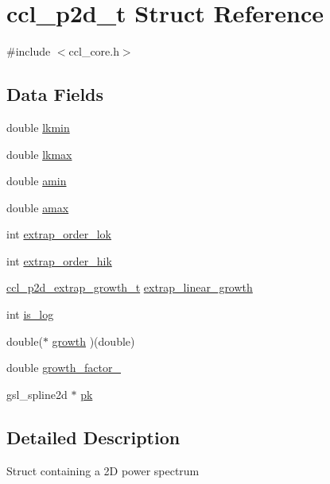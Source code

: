\hypertarget{structccl__p2d__t}{}\section{ccl\+\_\+p2d\+\_\+t Struct Reference}
\label{structccl__p2d__t}


{\ttfamily \#include $<$ccl\+\_\+core.\+h$>$}

\subsection*{Data Fields}
\begin{DoxyCompactItemize}
\item 
double \mbox{\hyperlink{structccl__p2d__t_a955661f32b72852c9bc7dfee5428c759}{lkmin}}
\item 
double \mbox{\hyperlink{structccl__p2d__t_aa95658067bf981859e38846ae8231f8f}{lkmax}}
\item 
double \mbox{\hyperlink{structccl__p2d__t_a9dd0557e6139d5560deb590157df53e3}{amin}}
\item 
double \mbox{\hyperlink{structccl__p2d__t_af090a647ddaaa73a69aadf73d6ae2bb5}{amax}}
\item 
int \mbox{\hyperlink{structccl__p2d__t_abc056210c9849cce402b91e4787df877}{extrap\+\_\+order\+\_\+lok}}
\item 
int \mbox{\hyperlink{structccl__p2d__t_a92786760b726c4e1ca48a9f403d79279}{extrap\+\_\+order\+\_\+hik}}
\item 
\mbox{\hyperlink{ccl__core_8h_a7c3bb0ab563e8da9e642173d5abdb208}{ccl\+\_\+p2d\+\_\+extrap\+\_\+growth\+\_\+t}} \mbox{\hyperlink{structccl__p2d__t_a6e804bda393db51d0b1e6536c8fcc387}{extrap\+\_\+linear\+\_\+growth}}
\item 
int \mbox{\hyperlink{structccl__p2d__t_a92b9bf0a9503a8afc7c3a7453c373ea6}{is\+\_\+log}}
\item 
double($\ast$ \mbox{\hyperlink{structccl__p2d__t_a3150bc4701ad47e331b7c4c4ef7e4948}{growth}} )(double)
\item 
double \mbox{\hyperlink{structccl__p2d__t_ae156c393da391e76c120937182c52580}{growth\+\_\+factor\+\_}}
\item 
gsl\+\_\+spline2d $\ast$ \mbox{\hyperlink{structccl__p2d__t_a4355819df1b2cb5302e149729d2b2c58}{pk}}
\end{DoxyCompactItemize}


\subsection{Detailed Description}
Struct containing a 2D power spectrum 

